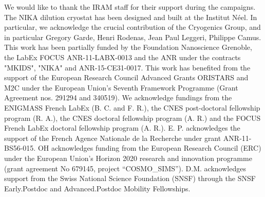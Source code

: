 \documentclass[twocolumn,traditabstract]{aa}
\begin{document}
\begin{acknowledgements}
We would like to thank the IRAM staff for their support during the campaigns. 
The NIKA dilution cryostat has been designed and built at the Institut N\'eel. In particular, we acknowledge the crucial contribution of the Cryogenics Group, and  in particular Gregory Garde, Henri Rodenas, Jean Paul Leggeri, Philippe Camus. 
This work has been partially funded by the Foundation Nanoscience Grenoble, the LabEx FOCUS ANR-11-LABX-0013 and the ANR under the contracts "MKIDS", "NIKA" and ANR-15-CE31-0017. 
This work has benefited from the support of the European Research Council Advanced Grants ORISTARS and M2C under the European Union's Seventh Framework Programme (Grant Agreement nos. 291294 and 340519).
We acknowledge fundings from the ENIGMASS French LabEx (B. C. and F. R.), the CNES post-doctoral fellowship program (R. A.),  the CNES doctoral fellowship program (A. R.) and the FOCUS French LabEx doctoral fellowship program (A. R.).
E. P. acknowledges the support of the French Agence Nationale de la Recherche under grant ANR-11-BS56-015.
OH acknowledges funding from the European Research Council (ERC) under the European Union's Horizon 2020 research and innovation programme (grant agreement No 679145, project “COSMO\_SIMS”).
D.M. acknowledges support from the Swiss National Science Foundation (SNSF) through the SNSF Early.Postdoc and Advanced.Postdoc Mobility Fellowships. 
\end{acknowledgements}



\appendix
\end{document}

